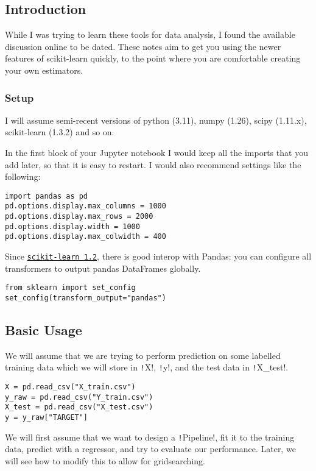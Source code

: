 \documentclass[11pt]{article}
\theoremstyle{definition}
\newcommand{\myhref}[2]{\href{#1}{\texttt{#2}}}
\begin{document}
\subsection{Introduction}
While I was trying to learn these tools for data analysis, I found the available discussion online to be dated. These notes aim to get you using the newer features of scikit-learn quickly, to the point where you are comfortable creating your own estimators.
\subsubsection{Setup}
I will assume semi-recent versions of python (3.11), numpy (1.26), scipy (1.11.x), scikit-learn (1.3.2) and so on.

In the first block of your Jupyter notebook I would keep all the imports that you add later, so that it is easy to restart. I would also recommend settings like the following:
\begin{verbatim}
import pandas as pd
pd.options.display.max_columns = 1000
pd.options.display.max_rows = 2000
pd.options.display.width = 1000
pd.options.display.max_colwidth = 400
\end{verbatim}
Since \myhref{https://scikit-learn.org/stable/auto_examples/release_highlights/plot_release_highlights_1_2_0.html}{scikit-learn 1.2}, there is good interop with Pandas: you can configure all transformers to output pandas DataFrames globally.
\begin{verbatim}
from sklearn import set_config
set_config(transform_output="pandas")
\end{verbatim}

\subsection{Basic Usage}
We will assume that we are trying to perform prediction on some labelled training data which we will store in \texttt!X!, \texttt!y!, and the test data in \texttt!X_test!.
\begin{verbatim}
X = pd.read_csv("X_train.csv") 
y_raw = pd.read_csv("Y_train.csv")  
X_test = pd.read_csv("X_test.csv")
y = y_raw["TARGET"]
\end{verbatim}

We will first assume that we want to design a \texttt!Pipeline!, fit it to the training data, predict with a regressor, and try to evaluate our performance. Later, we will see how to modify this to allow for gridsearching.
\end{document}
